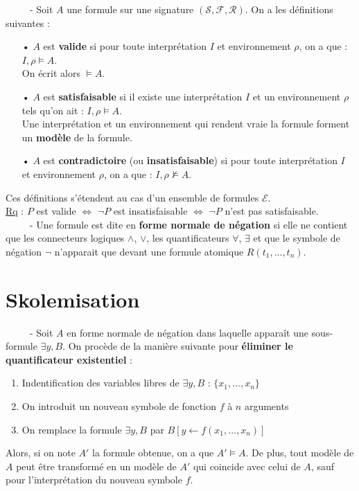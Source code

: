 \documentclass[11pt,a4paper]{article}
\begin{document}
\ \ \ \ \ - Soit $A$ une formule sur une signature $(\mathcal{S},\mathcal{F},\mathcal{R})$. On a les définitions suivantes :
\begin{itemize}
\item[•] $A$ est \textbf{valide} si pour toute interprétation $I$ et environnement $\rho$, on a que : $I,\rho \models A$. \\ On écrit alors $\models A$.
\item[•] $A$ est \textbf{satisfaisable} si il existe une interprétation $I$ et un environnement $\rho$ tels qu'on ait : $I,\rho \models A$. \\ Une interprétation et un environnement qui rendent vraie la formule forment un \textbf{modèle} de la formule.
\item[•]  $A$ est \textbf{contradictoire} (ou \textbf{insatisfaisable}) si pour toute interprétation $I$ et environnement $\rho$, on a que : $I,\rho \not\models A$.
\end{itemize}
Ces définitions s'étendent au cas d'un ensemble de formules $\mathcal{E}$. \\

\underline{Rq} : $P$ est valide $\Leftrightarrow$ $\lnot P$ est insatisfaisable $\Leftrightarrow$ $\lnot P$ n'est pas satisfaisable. \\

\ \ \ \ \ - Une formule est dite en \textbf{forme normale de négation} si elle ne contient que les connecteurs logiques $\land$, $\lor$, les quantificateurs $\forall$, $\exists$ et que le symbole de négation $\lnot$ n’apparait que devant une formule atomique $R(t_1, . . . , t_n)$. \\

\section{Skolemisation}

\ \ \ \ \ - Soit $A$ en forme normale de négation dans laquelle apparaît une sous-formule $\exists y, B$. On procède de la manière suivante pour \textbf{éliminer le quantificateur existentiel} :
\begin{enumerate}
\item Indentification des variables libres de $\exists y, B$ : $\{x_1, \dots, x_n \}$
\item On introduit un nouveau symbole de fonction $f$ à $n$ arguments
\item On remplace la formule $\exists y, B$ par $B[y \leftarrow f(x_1,\dots,x_n)]$
\end{enumerate}
Alors, si on note $A'$ la formule obtenue, on a que $A' \models A$. De plus, tout modèle de $A$ peut être transformé en un modèle de $A'$ qui coincide avec celui de $A$, sauf pour l'interprétation du nouveau symbole $f$. \\ \\
\end{document}
